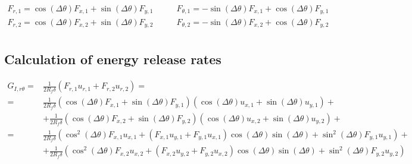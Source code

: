 \documentclass[a4paper]{jpconf}
\begin{document}
\begin{equation}
\begin{split}
F_{r,1}=\cos\left(\Delta\theta\right) F_{x,1}+\sin\left(\Delta\theta\right) F_{y,1}&\qquad F_{\theta,1}=-\sin\left(\Delta\theta\right) F_{x,1}+\cos\left(\Delta\theta\right) F_{y,1}\\
F_{r,2}=\cos\left(\Delta\theta\right) F_{x,2}+\sin\left(\Delta\theta\right) F_{y,2}&\qquad F_{\theta,2}=-\sin\left(\Delta\theta\right) F_{x,2}+\cos\left(\Delta\theta\right) F_{y,2}\\
\end{split}
\end{equation}

\subsection{Calculation of energy release rates}

\begin{equation}
\begin{split}
G_{I,r\theta} = &\frac{1}{2R_{f}\delta}\left(F_{r,1}u_{r,1}+F_{r,2}u_{r,2}\right)=\\
= &\frac{1}{2R_{f}\delta}\left(\cos\left(\Delta\theta\right) F_{x,1}+\sin\left(\Delta\theta\right)F_{y,1}\right)\left(\cos\left(\Delta\theta\right) u_{x,1}+\sin\left(\Delta\theta\right) u_{y,1}\right)+\\
&+\frac{1}{2R_{f}\delta}\left(\cos\left(\Delta\theta\right) F_{x,2}+\sin\left(\Delta\theta\right)F_{y,2}\right)\left(\cos\left(\Delta\theta\right) u_{x,2}+\sin\left(\Delta\theta\right) u_{y,2}\right)+\\
= &\frac{1}{2R_{f}\delta}\left(\cos^{2}\left(\Delta\theta\right) F_{x,1}u_{x,1}+\left(F_{x,1}u_{y,1}+F_{y,1}u_{x,1}\right)\cos\left(\Delta\theta\right)\sin\left(\Delta\theta\right)+\sin^{2}\left(\Delta\theta\right)F_{y,1}u_{y,1}\right)+\\
&+\frac{1}{2R_{f}\delta}\left(\cos^{2}\left(\Delta\theta\right) F_{x,2}u_{x,2}+\left(F_{x,2}u_{y,2}+F_{y,2}u_{x,2}\right)\cos\left(\Delta\theta\right)\sin\left(\Delta\theta\right)+\sin^{2}\left(\Delta\theta\right)F_{y,2}u_{y,2}\right)
\end{split}
\end{equation}
\end{document}

